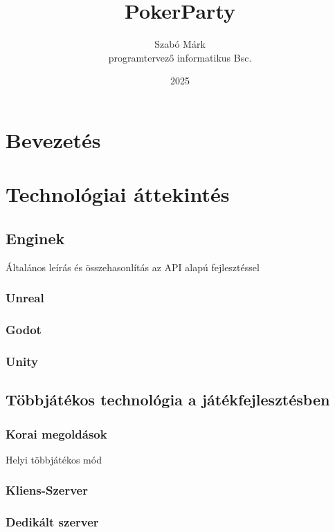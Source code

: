 \documentclass[]{thesis-ekf}
\theoremstyle{definition}
\theoremstyle{remark}
\begin{document}
\title{PokerParty}
\author{Szabó Márk\\programtervező informatikus Bsc.}
\date{2025}
\maketitle

\tableofcontents

\chapter*{Bevezetés}

\chapter{Technológiai áttekintés}

\section{Enginek}
Általános leírás és összehasonlítás az API alapú fejlesztéssel

\subsection{Unreal}
\subsection{Godot}
\subsection{Unity}

\section{Többjátékos technológia a játékfejlesztésben}

\subsection{Korai megoldások}
Helyi többjátékos mód
\subsection{Kliens-Szerver}
\subsection{Dedikált szerver}
\end{document}
